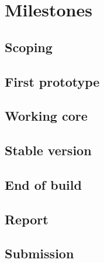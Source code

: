 \section{Milestones}

\subsection{Scoping}
\subsection{First prototype}
\subsection{Working core}
\subsection{Stable version}
\subsection{End of build}
\subsection{Report}
\subsection{Submission}